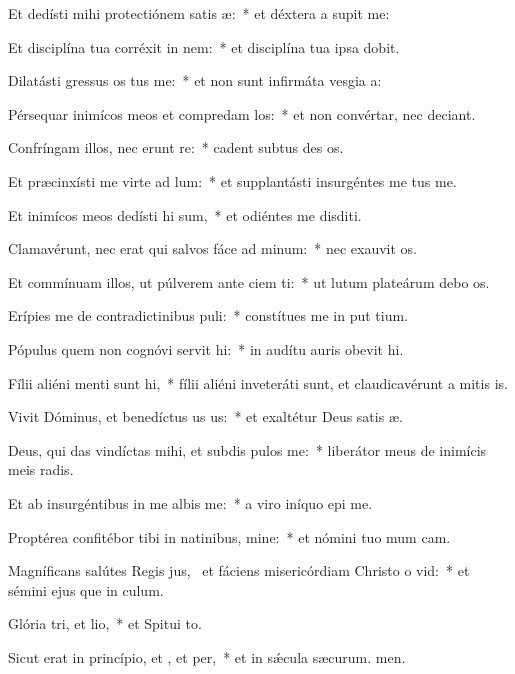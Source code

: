 \item Et dedísti mihi protectiónem satis æ:~* et déxtera a supit me:
\item Et disciplína tua corréxit  in nem:~* et disciplína tua ipsa  dobit.
\item Dilatásti gressus os tus me:~* et non sunt infirmáta vesgia a:
\item Pérsequar inimícos meos et compredam los:~* et non convértar, nec deciant.
\item Confríngam illos, nec erunt re:~* cadent subtus des os.
\item Et præcinxísti me virte ad lum:~* et supplantásti insurgéntes  me tus me.
\item Et inimícos meos dedísti hi sum,~* et odiéntes me disditi.
\item Clamavérunt, nec erat qui salvos fáce ad minum:~* nec exauvit os.
\item Et commínuam illos, ut púlverem ante ciem ti:~* ut lutum plateárum debo os.
\item Erípies me de contradictinibus puli:~* constítues me in put tium.
\item Pópulus quem non cognóvi servit hi:~* in audítu auris obevit hi.
\item Fílii aliéni menti sunt hi,~* fílii aliéni inveteráti sunt, et claudicavérunt a mitis is.
\item Vivit Dóminus, et benedíctus us us:~* et exaltétur Deus satis æ.
\item Deus, qui das vindíctas mihi, et subdis pulos  me:~* liberátor meus de inimícis meis radis.
\item Et ab insurgéntibus in me albis me:~* a viro iníquo epi me.
\item Proptérea confitébor tibi in natinibus, mine:~* et nómini tuo mum cam.
\item Magníficans salútes Regis jus,~\pscross{} et fáciens misericórdiam Christo o vid:~* et sémini ejus que in culum.
\item Glória tri, et lio,~* et Spitui to.
\item Sicut erat in princípio, et , et per,~* et in sǽcula sæcurum. men.
